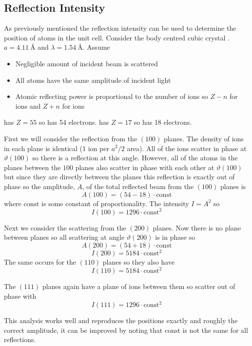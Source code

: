    \subsection{Reflection Intensity}
    As previously mentioned the reflection intensity can be used to determine the position of atoms in the unit cell.
    Consider the body centred cubic crystal .
    \(a = \SI{4.11}{\angstrom}\) and \(\lambda = \SI{1.54}{\angstrom}\).
    Assume
    \begin{itemize}
        \item Negligible amount of incident beam is scattered
        \item All atoms have the same amplitude of incident light
        \item Atomic reflecting power is proportional to the number of ions so \(Z - n\) for  ions and \(Z + n\) for  ions
    \end{itemize}
     has \(Z = 55\) so has 54 electrons.
     has \(Z = 17\) so has 18 electrons.
    
    First we will consider the reflection from the \((100)\) planes.
    The density of ions in each plane is identical (1 ion per \(a^2/2\) area).
    All of the  ions scatter in phase at \(\vartheta(100)\) so there is a reflection at this angle.
    However, all of the  atoms in the planes between the \(100\) planes also scatter in phase with each other at \(\vartheta(100)\) but since they are directly between the  planes this reflection is exactly out of phase so the amplitude, \(A\), of the total reflected beam from the \((100)\) planes is
    \[A(100) = (54 - 18)\cdot\text{const}\]
    where \(\text{const}\) is some constant of proportionality.
    The intensity \(I = A^2\) so
    \[I(100) = 1296\cdot\text{const}^2\]
    
    Next we consider the scattering from the \((200)\) planes.
    Now there is no plane between planes so all scattering at angle \(\vartheta(200)\) is in phase so
    \[A(200) = (54 + 18)\cdot\text{const}\]
    \[I(200) = 5184\cdot\text{const}^2\]
    The same occurs for the \((110)\) planes so they also have 
    \[I(110) = 5184\cdot\text{const}^2\]
    
    The \((111)\) planes again have a plane of  ions between them so scatter out of phase with
    \[I(111) = 1296\cdot\text{const}^2\]
    
    This analysis works well and reproduces the positions exactly and roughly the correct amplitude, it can be improved by noting that \(\text{const}\) is not the same for all reflections.
    
